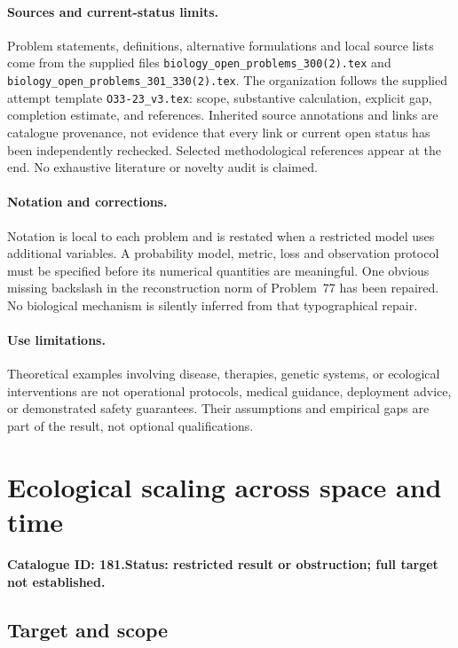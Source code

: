 \documentclass[11pt]{article}
\begin{document}
\paragraph{Sources and current-status limits.}
Problem statements, definitions, alternative formulations and local source lists
come from the supplied files
\texttt{biology\_open\_problems\_300(2).tex} and
\texttt{biology\_open\_problems\_301\_330(2).tex}.
The organization follows the supplied attempt template
\texttt{O33-23\_v3.tex}: scope, substantive calculation, explicit gap,
completion estimate, and references. Inherited source annotations and links are
catalogue provenance, not evidence that every link or current open status has
been independently rechecked. Selected methodological references appear at the
end. No exhaustive literature or novelty audit is claimed.

\paragraph{Notation and corrections.}
Notation is local to each problem and is restated when a restricted model uses
additional variables. A probability model, metric, loss and observation protocol
must be specified before its numerical quantities are meaningful. One obvious
missing backslash in the reconstruction norm of Problem~77 has been repaired.
No biological mechanism is silently inferred from that typographical repair.

\paragraph{Use limitations.}
Theoretical examples involving disease, therapies, genetic systems, or ecological
interventions are not operational protocols, medical guidance, deployment advice,
or demonstrated safety guarantees. Their assumptions and empirical gaps are part
of the result, not optional qualifications.

\setcounter{section}{180}
\section{Ecological scaling across space and time}
\label{prob:181}
\noindent\textbf{Catalogue ID: 181.}\quad \textbf{Status: restricted result or obstruction; full target not established.}
\subsection{Target and scope}
\end{document}
